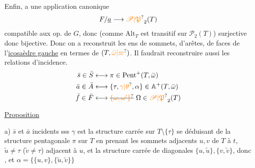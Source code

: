 Enfin,  a une application canonique
\[
 F/\underline a\longrightarrow\unsure{\mathscr P|\mathfrak P}_2(T)
\]
compatible aux op. de $G$, donc (comme $\mathrm{Alt}_T$ est transitif sur $\mathscr P_2(T)$) surjective donc bijective.
Donc on a reconstruit les ens de sommets, d'arêtes, de faces de l'\uline{icosaèdre gauche} en termes de $(T,\unsure{\bar\omega|\varpi})$. Il faudrait reconstruire aussi les relations d'incidence.
\[
\begin{aligned}
\bar s\in\bar S&\longleftrightarrow\pi\in\mathrm{Pent}^+(T,\bar\omega)\\
\bar a\in\bar A&\longleftrightarrow\{\tau,\unsure{\gamma|\theta},\alpha\}\in\mathbb A^+(T,\bar\omega)\\
\bar f\in\bar F&\longleftrightarrow\deleted{\unsure{\{\omega,\omega'\}}}\ \Omega\in\unsure{\mathscr P|\mathfrak P}_2(T)
\end{aligned}
\]

\uline{Proposition}

a) $\bar s$ et $\bar a$ incidents sss $\gamma$ est la structure carrée sur $T\setminus\{\tau\}$ se déduisant de la structure pentagonale $\pi$ sur $T$ en prenant les sommets adjacents $u,v$ de $T$ à $t$, $\tilde u\ne\tau$ ($\tilde v\ne\tau$) adjacent à $u$, et la structure carrée de diagonales $\{u,\tilde u\},\{v,\tilde v\}$, donc 
, et $\alpha=\{\{u,v\},\{\tilde u,\tilde v\}\}$


